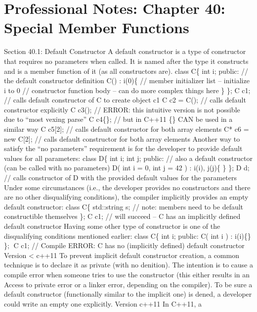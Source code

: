 \hypertarget{professional-notes-chapter-40-special-member-functions-1}{%
\section{Professional Notes: Chapter 40: Special Member
Functions}\label{professional-notes-chapter-40-special-member-functions-1}}

Section 40.1: Default Constructor A default constructor is a type of
constructor that requires no parameters when called. It is named after
the type it constructs and is a member function of it (as all
constructors are). class C\{ int i; public: // the default constructor
definition C() : i(0)\{ // member initializer list -- initialize i to 0
// constructor function body -- can do more complex things here \} \}; C
c1; // calls default constructor of C to create object c1 C c2 = C(); //
calls default constructor explicitly C c3(); // ERROR: this intuitive
version is not possible due to ``most vexing parse'' C c4\{\}; // but in
C++11 \{\} CAN be used in a similar way C c5{[}2{]}; // calls default
constructor for both array elements C* c6 = new C{[}2{]}; // calls
default constructor for both array elements Another way to satisfy the
``no parameters'' requirement is for the developer to provide default
values for all parameters: class D\{ int i; int j; public: // also a
default constructor (can be called with no parameters) D( int i = 0, int
j = 42 ) : i(i), j(j)\{ \} \}; D d; // calls constructor of D with the
provided default values for the parameters Under some circumstances
(i.e., the developer provides no constructors and there are no other
disqualifying conditions), the compiler implicitly provides an empty
default constructor: class C\{ std::string s; // note: members need to
be default constructible themselves \}; C c1; // will succeed -- C has
an implicitly defined default constructor Having some other type of
constructor is one of the disqualifying conditions mentioned earlier:
class C\{ int i; public: C( int i ) : i(i)\{\} \}; C c1; // Compile
ERROR: C has no (implicitly defined) default constructor Version
\textless{} c++11 To prevent implicit default constructor creation, a
common technique is to declare it as private (with no denition). The
intention is to cause a compile error when someone tries to use the
constructor (this either results in an Access to private error or a
linker error, depending on the compiler). To be sure a default
constructor (functionally similar to the implicit one) is dened, a
developer could write an empty one explicitly. Version c++11 In C++11, a

